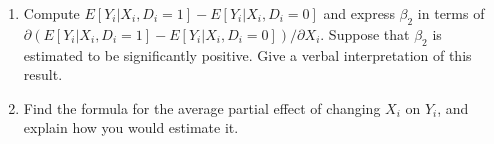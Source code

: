 \documentclass[11pt]{article}
\newcommand{\Blue}{\color{blue}}
\begin{document}
\begin{enumerate}
\begin{enumerate}
\item  Compute $E[Y_i|X_i,D_i=1]-E[Y_i|X_i,D_i=0]$ and express $\beta_2$ in terms of $\partial (E[Y_i|X_i,D_i=1]-E[Y_i|X_i,D_i=0])/\partial X_i$.
Suppose that $\beta_2$ is estimated to be significantly positive. Give a verbal interpretation of this result.


\item Find the formula for the average partial effect of changing $X_i$ on $Y_i$, and explain how you would estimate it.




    \end{enumerate}

    \end{enumerate}

\bigskip





\end{document}
